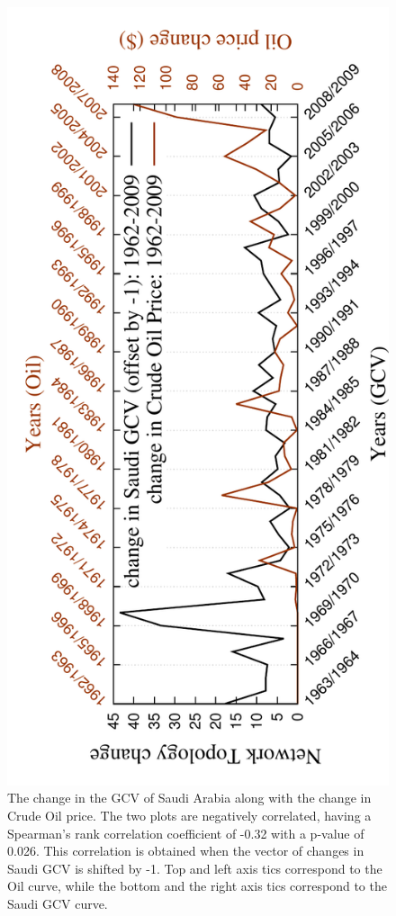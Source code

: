 \begin{figure}[H]
  \centering
\includegraphics[angle=-90,scale=0.6]
{../code/extra_results/saudi_oil/saudi_norm1_gcv_oil2}
\caption[The change in the GCV of Saudi Arabia along with the change in Crude Oil price.]{The change in the GCV of Saudi Arabia along with the change in Crude Oil price. The two plots are negatively correlated, having a Spearman's rank correlation coefficient of -0.32 with a p-value of 0.026. This correlation is obtained when the vector of changes in Saudi GCV is shifted by -1. Top and left axis tics correspond to the Oil curve, while the bottom and the right axis tics correspond to the Saudi GCV curve.}
\label{saudi_oil}
\end{figure}


